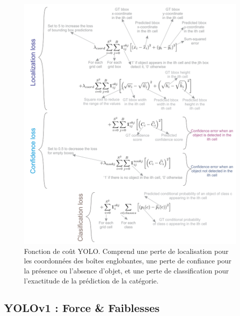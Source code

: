 \documentclass{article}
\begin{document}
\begin{figure}[htbp]
    \centering
    \includegraphics[scale=0.25]{Figures/cost.png}
    \caption{Fonction de coût YOLO. Comprend une perte de localisation pour les coordonnées des boîtes englobantes, une perte de confiance pour la présence ou l'absence d'objet, et une perte de classification pour l'exactitude de la prédiction de la catégorie.}
    \label{fig:cost}
\end{figure}
\vspace{0.6cm}

\subsection{YOLOv1 : Force \& Faiblesses}
\end{document}
